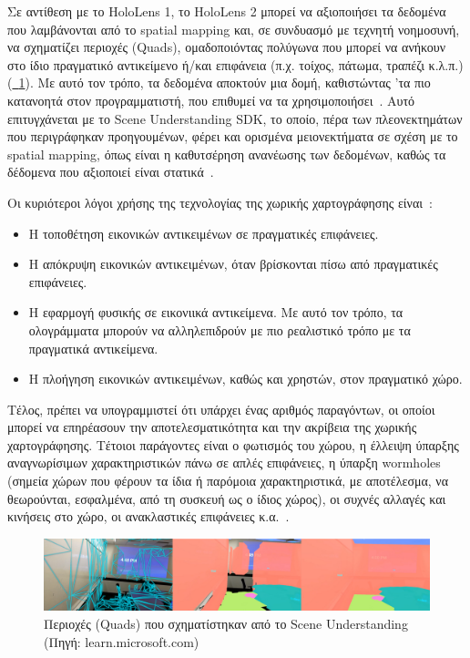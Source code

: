 Σε αντίθεση με το HoloLens 1, το HoloLens 2 μπορεί να αξιοποιήσει τα δεδομένα που λαμβάνονται από το spatial mapping και, σε συνδυασμό με τεχνητή νοημοσυνή, να σχηματίζει περιοχές (Quads), ομαδοποιόντας πολύγωνα που μπορεί να ανήκουν στο ίδιο πραγματικό αντικείμενο ή/και επιφάνεια (π.χ. τοίχος, πάτωμα, τραπέζι κ.λ.π.) (\hyperref[fig:sceneUnderstandingExample]{\schema~\ref*{fig:sceneUnderstandingExample}}). Με αυτό τον τρόπο, τα δεδομένα αποκτούν μια δομή, καθιστώντας 'τα πιο κατανοητά στον προγραμματιστή, που επιθυμεί να τα χρησιμοποιήσει~\cite{szymons_2022_scene}. Αυτό επιτυγχάνεται με το Scene Understanding SDK, το οποίο, πέρα των πλεονεκτημάτων που περιγράφηκαν προηγουμένων, φέρει και ορισμένα μειονεκτήματα σε σχέση με το spatial mapping, όπως είναι η καθυτσέρηση ανανέωσης των δεδομένων, καθώς τα δέδομενα που αξιοποιεί είναι στατικά~\cite{mattzmsft_2023_spatial}.

Οι κυριότεροι λόγοι χρήσης της τεχνολογίας της χωρικής χαρτογράφησης είναι~\cite{mattzmsft_2023_spatial}:
\begin{itemize}
    \item Η τοποθέτηση εικονικών αντικειμένων σε πραγματικές επιφάνειες.
    \item Η απόκρυψη εικονικών αντικειμένων, όταν βρίσκονται πίσω από πραγματικές επιφάνειες.
    \item Η εφαρμογή φυσικής σε εικονιικά αντικείμενα. Με αυτό τον τρόπο, τα ολογράμματα μπορούν να αλληλεπιδρούν με πιο ρεαλιστικό τρόπο με τα πραγματικά αντικείμενα.
    \item Η πλοήγηση εικονικών αντικειμένων, καθώς και χρηστών, στον πραγματικό χώρο.
\end{itemize}

Τέλος, πρέπει να υπογραμμιστεί ότι υπάρχει ένας αριθμός παραγόντων, οι οποίοι μπορεί να επηρέασουν την αποτελεσματικότητα και την ακρίβεια της χωρικής χαρτογράφησης. Τέτοιοι παράγοντες είναι ο φωτισμός του χώρου, η έλλειψη ύπαρξης αναγνωρίσιμων χαρακτηριστικών πάνω σε απλές επιφάνειες, η ύπαρξη wormholes (σημεία χώρων που φέρουν τα ίδια ή παρόμοια χαρακτηριστικά, με αποτέλεσμα, να θεωρούνται, εσφαλμένα, από τη συσκευή ως ο ίδιος χώρος), οι συχνές αλλαγές και κινήσεις στο χώρο, οι ανακλαστικές επιφάνειες κ.α.~\cite{dorreneb_2022_hololens}.

\begin{figure}[!hb]
    \centering
    \includegraphics[width=1\textwidth]{images/sm_and_su_comparisson.png}
    \caption{Περιοχές (Quads) που σχηματίστηκαν από το Scene Understanding {\footnotesize (Πηγή: learn.microsoft.com)}}\label{fig:sceneUnderstandingExample}
\end{figure}

